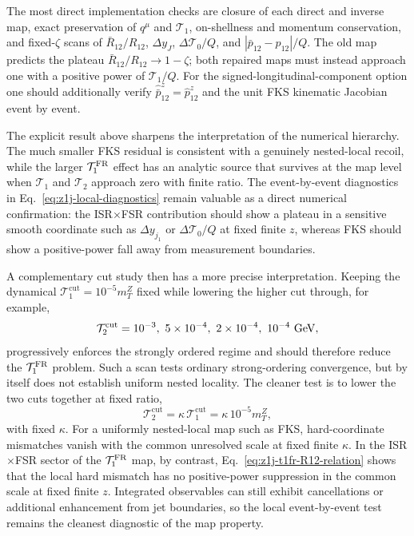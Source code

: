 \documentclass[11pt]{article}
\newcommand{\cut}{\mathrm{cut}}
\begin{document}
The most direct implementation checks are closure of each direct and inverse map, exact preservation of
$q^\mu$ and $\mathcal T_1$, on-shellness and momentum conservation, and fixed-$\zeta$ scans of
$\bar R_{12}/R_{12}$, $\Delta y_J$, $\Delta\mathcal T_0/Q$, and
$|\bar p_{12}-p_{12}|/Q$.  The old map predicts the plateau
$\bar R_{12}/R_{12}\to1-\zeta$; both repaired maps must instead approach one with a positive power of
$\mathcal T_1/Q$.  For the signed-longitudinal-component option one should additionally verify
$\hat{\bar p}_{12}^z=\hat p_{12}^z$ and the unit FKS kinematic Jacobian event by event.

The explicit result above sharpens the interpretation of the numerical hierarchy.  The much smaller FKS
residual is consistent with a genuinely nested-local recoil, while the larger $\mathcal T_1^{\rm FR}$ effect
has an analytic source that survives at the map level when $\mathcal T_1$ and $\mathcal T_2$ approach zero
with finite ratio.  The event-by-event diagnostics in Eq.~\eqref{eq:z1j-local-diagnostics} remain valuable as
a direct numerical confirmation: the ISR$\times$FSR contribution should show a plateau in a sensitive smooth
coordinate such as $\Delta y_{j_1}$ or $\Delta\mathcal T_0/Q$ at fixed finite $z$, whereas FKS should show a
positive-power fall away from measurement boundaries.

A complementary cut study then has a more precise interpretation. Keeping the dynamical
$\mathcal T_1^{\cut}=10^{-5}m_T^Z$ fixed while lowering the higher cut through, for example,
\begin{equation}
\mathcal T_2^{\cut}
=
10^{-3},\ 5\times10^{-4},\ 2\times10^{-4},\ 10^{-4}\ {\rm GeV},
\label{eq:z1j-t2cut-scan}
\end{equation}
progressively enforces the strongly ordered regime and should therefore reduce the $\mathcal T_1^{\rm FR}$
problem.  Such a scan tests ordinary strong-ordering convergence, but by itself does not establish uniform
nested locality.  The cleaner test is to lower the two cuts together at fixed ratio,
\begin{equation}
\mathcal T_2^{\cut}
=\kappa\,\mathcal T_1^{\cut}
=\kappa\,10^{-5}m_T^Z,
\label{eq:z1j-correlated-cut-scan}
\end{equation}
with fixed $\kappa$.  For a uniformly nested-local map such as FKS, hard-coordinate mismatches vanish with the
common unresolved scale at fixed finite $\kappa$.  In the ISR$\times$FSR sector of the
$\mathcal T_1^{\rm FR}$ map, by contrast, Eq.~\eqref{eq:z1j-t1fr-R12-relation} shows that the local hard
mismatch has no positive-power suppression in the common scale at fixed finite $z$.  Integrated observables
can still exhibit cancellations or additional enhancement from jet boundaries, so the local event-by-event
test remains the cleanest diagnostic of the map property.
\end{document}
